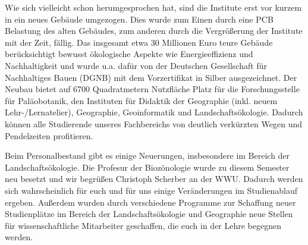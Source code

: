Wie sich vielleicht schon herumgesprochen hat, sind die Institute erst vor kurzem in ein neues Gebäude umgezogen. Dies wurde zum Einen durch eine PCB Belastung des alten Gebäudes, zum anderen durch die Vergrößerung der Institute mit der Zeit, fällig. Das insgesamt etwa 30 Millionen Euro teure Gebäude berücksichtigt bewusst ökologische Aspekte wie Energieeffizienz und Nachhaltigkeit und wurde u.a. dafür von der Deutschen Gesellschaft für Nachhaltiges Bauen (DGNB) mit dem Vorzertifikat in Silber ausgezeichnet. Der Neubau bietet auf 6700 Quadratmetern Nutzfläche Platz für die Forschungsstelle für Paläobotanik, den Instituten für Didaktik der Geographie (inkl. neuem Lehr-/Lernatelier), Geographie, Geoinformatik und Landschaftsökologie. Dadurch können alle Studierende unseres Fachbereichs von deutlich verkürzten Wegen und Pendelzeiten profitieren.

Beim Personalbestand gibt es einige Neuerungen, insbesondere im Bereich der Landschaftsökologie. Die Profesur der Biozönologie wurde zu diesem Semester neu besetzt und wir begrüßen Christoph Scherber an der WWU. Dadurch werden sich wahrscheinlich für euch und für uns einige Veränderungen im Studienablauf ergeben. Außerdem wurden durch verschiedene Programme zur Schaffung neuer Studienplätze im Bereich der Landschaftsökologie und Geographie neue Stellen für wissenschaftliche Mitarbeiter geschaffen, die euch in der Lehre begegnen werden. 

